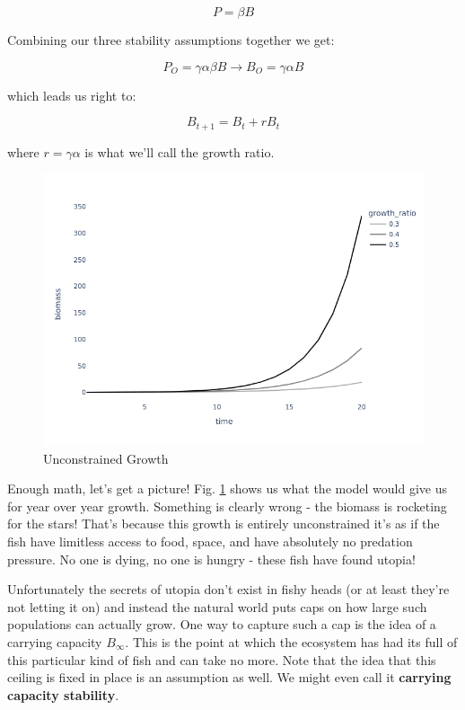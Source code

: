 \documentclass[11pt,a5paper]{book}
\begin{document}
$$P = \beta B$$

Combining our three stability assumptions together we get:

$$P_O = \gamma \alpha \beta B \rightarrow B_O = \gamma \alpha B $$

which leads us right to:

$$B_{t+1} = B_{t} + rB_t$$

where $r=\gamma \alpha$ is what we'll call the growth ratio. 
\newline

\begin{figure}[h!] 
  \includegraphics[width=\linewidth]{notebooks/SurplusModels/exponential_growth.png}
  \caption{Unconstrained Growth}
  \label{fig:unconstrained_growth}
\end{figure}

Enough math, let's get a picture! Fig. \ref{fig:unconstrained_growth} shows us what the model would give us for year over year growth. Something is clearly wrong - the biomass is rocketing for the stars! That's because this growth is entirely unconstrained it's as if the fish have limitless access to food, space, and have absolutely no predation pressure. No one is dying, no one is hungry - these fish have found utopia!
\newline

Unfortunately the secrets of utopia don't exist in fishy heads (or at least they're not letting it on) and instead the natural world puts caps on how large such populations can actually grow. One way to capture such a cap is the idea of a carrying capacity $B_{\infty}$. This is the point at which the ecosystem has had its full of this particular kind of fish and can take no more. Note that the idea that this ceiling is fixed in place is an assumption as well. We might even call it \textbf{carrying capacity stability}. 
\newline
\end{document}
